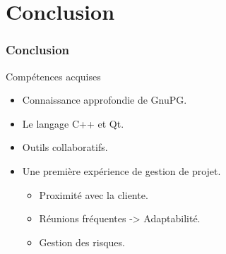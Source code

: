\section{Conclusion}
\begin{frame}
  \frametitle{\color{white}Conclusion}
  \begin{block}{Compétences acquises}
      \begin{itemize}
        \item Connaissance approfondie de GnuPG.
        \item Le langage C++ et Qt.
        \item Outils collaboratifs.
        \item Une première expérience de gestion de projet.
        \begin{itemize}
	        \item Proximité avec la cliente.
	        \item Réunions fréquentes -> Adaptabilité.
	        \item Gestion des risques.
      	\end{itemize}
      \end{itemize}
    \end{block}
\end{frame}
        
